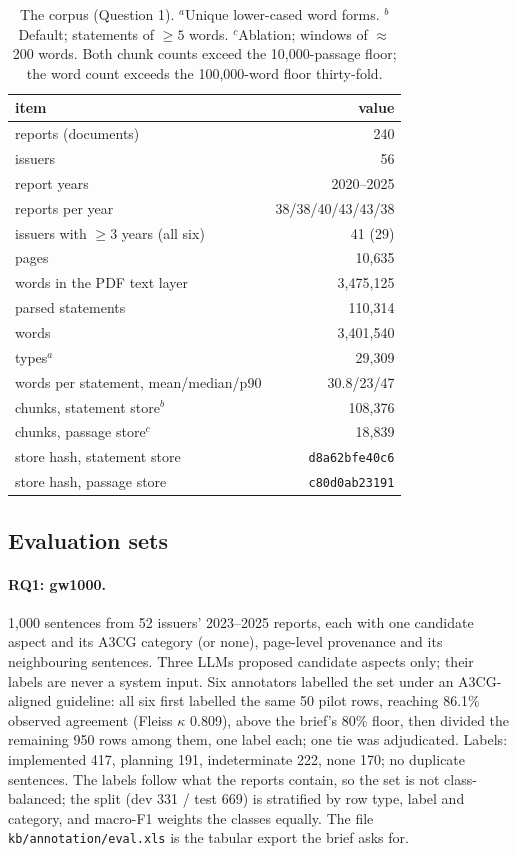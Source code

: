 \documentclass[11pt]{article}
\newcommand{\file}[1]{\nolinkurl{#1}}
\newcommand{\kappaval}{$\kappa$}
\begin{document}
\begin{table}[t]
\centering\footnotesize
\setlength{\tabcolsep}{3pt}
\begin{tabular*}{\columnwidth}{@{}l@{\extracolsep{\fill}}r@{}}
\toprule
item & value \\
\midrule
reports (documents) & 240 \\
issuers & 56 \\
report years & 2020--2025 \\
\quad reports per year & 38/38/40/43/43/38 \\
issuers with $\ge 3$ years (all six) & 41 (29) \\
pages & 10,635 \\
words in the PDF text layer & 3,475,125 \\
parsed statements & 110,314 \\
\quad words & 3,401,540 \\
\quad types$^{a}$ & 29,309 \\
\quad words per statement, mean/median/p90 & 30.8/23/47 \\
chunks, statement store$^{b}$ & 108,376 \\
chunks, passage store$^{c}$ & 18,839 \\
store hash, statement store & \texttt{d8a62bfe40c6} \\
store hash, passage store & \texttt{c80d0ab23191} \\
\bottomrule
\end{tabular*}
\caption{The corpus (Question 1). $^{a}$Unique lower-cased word forms. $^{b}$Default; statements of $\ge 5$ words. $^{c}$Ablation; windows of $\approx$200 words. Both chunk counts exceed the 10,000-passage floor; the word count exceeds the 100,000-word floor thirty-fold.}
\label{tab:corpus}
\end{table}

\subsection{Evaluation sets}
\label{sec:evalsets}

\paragraph{RQ1: gw1000.}
1,000 sentences from 52 issuers' 2023--2025 reports, each with one candidate aspect and its A3CG category (or none), page-level provenance and its neighbouring sentences. Three LLMs proposed candidate aspects only; their labels are never a system input. Six annotators labelled the set under an A3CG-aligned guideline: all six first labelled the same 50 pilot rows, reaching 86.1\% observed agreement (Fleiss \kappaval{} 0.809), above the brief's 80\% floor, then divided the remaining 950 rows among them, one label each; one tie was adjudicated. Labels: implemented 417, planning 191, indeterminate 222, none 170; no duplicate sentences. The labels follow what the reports contain, so the set is not class-balanced; the split (dev 331 / test 669) is stratified by row type, label and category, and macro-F1 weights the classes equally. The file \file{kb/annotation/eval.xls} is the tabular export the brief asks for.
\end{document}
